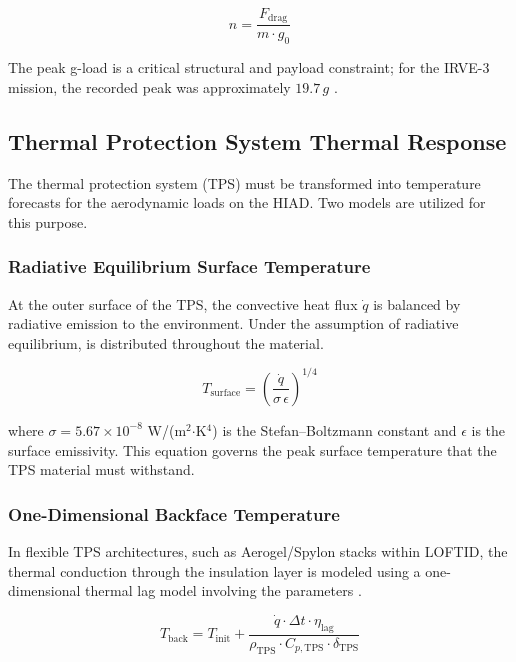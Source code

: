 \begin{equation}
    n = \frac{F_{\text{drag}}}{m \cdot g_0}
    \label{eq:gload}
\end{equation}

\noindent The peak g-load is a critical structural and payload constraint; for the IRVE-3 mission, the recorded peak was approximately $19.7\,g$ \cite{old2013irve3postflight}.

\subsection{Thermal Protection System Thermal Response}
The thermal protection system (TPS) must be transformed into temperature forecasts for the aerodynamic loads on the HIAD. Two models are utilized for this purpose.

\subsubsection*{Radiative Equilibrium Surface Temperature}
At the outer surface of the TPS, the convective heat flux $\dot{q}$ is balanced by radiative emission to the environment. Under the assumption of radiative equilibrium, \cite{AndersonHypersonic}is distributed throughout the material.

\begin{equation}
    T_{\text{surface}} = \left( \frac{\dot{q}}{\sigma \, \epsilon} \right)^{1/4}
    \label{eq:radiative_equilibrium}
\end{equation}

\noindent where $\sigma = 5.67 \times 10^{-8}$ W/(m$^{2}$$\cdot$K$^{4}$) is the Stefan--Boltzmann constant and $\epsilon$ is the surface emissivity. This equation governs the peak surface temperature that the TPS material must withstand.

\subsubsection*{One-Dimensional Backface Temperature}
In flexible TPS architectures, such as Aerogel/Spylon stacks within LOFTID, the thermal conduction through the insulation layer is modeled using a one-dimensional thermal lag model involving the parameters \cite{hollis2017backface}.

\begin{equation}
    T_{\text{back}} = T_{\text{init}} + \frac{\dot{q} \cdot \Delta t \cdot \eta_{\text{lag}}}{\rho_{\text{TPS}} \cdot C_{p,\text{TPS}} \cdot \delta_{\text{TPS}}}
    \label{eq:backface_temperature}
\end{equation}

